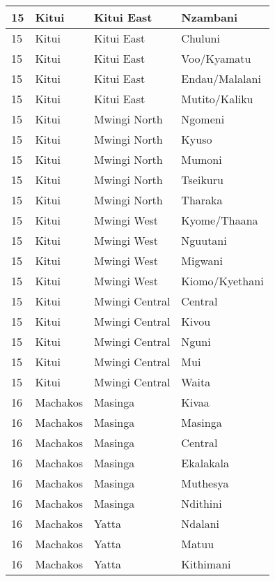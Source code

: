 \begin{table}[!ht]
\begin{tabular}{|l|l|l|l|}
        15 & Kitui & Kitui East & Nzambani \\ \hline
        15 & Kitui & Kitui East & Chuluni \\ \hline
        15 & Kitui & Kitui East & Voo/Kyamatu \\ \hline
        15 & Kitui & Kitui East & Endau/Malalani \\ \hline
        15 & Kitui & Kitui East & Mutito/Kaliku \\ \hline
        15 & Kitui & Mwingi North & Ngomeni \\ \hline
        15 & Kitui & Mwingi North & Kyuso \\ \hline
        15 & Kitui & Mwingi North & Mumoni \\ \hline
        15 & Kitui & Mwingi North & Tseikuru \\ \hline
        15 & Kitui & Mwingi North & Tharaka \\ \hline
        15 & Kitui & Mwingi West & Kyome/Thaana \\ \hline
        15 & Kitui & Mwingi West & Nguutani \\ \hline
        15 & Kitui & Mwingi West & Migwani \\ \hline
        15 & Kitui & Mwingi West & Kiomo/Kyethani \\ \hline
        15 & Kitui & Mwingi Central & Central \\ \hline
        15 & Kitui & Mwingi Central & Kivou \\ \hline
        15 & Kitui & Mwingi Central & Nguni \\ \hline
        15 & Kitui & Mwingi Central & Mui \\ \hline
        15 & Kitui & Mwingi Central & Waita \\ \hline
        16 & Machakos & Masinga & Kivaa \\ \hline
        16 & Machakos & Masinga & Masinga \\ \hline
        16 & Machakos & Masinga & Central \\ \hline
        16 & Machakos & Masinga & Ekalakala \\ \hline
        16 & Machakos & Masinga & Muthesya \\ \hline
        16 & Machakos & Masinga & Ndithini \\ \hline
        16 & Machakos & Yatta & Ndalani \\ \hline
        16 & Machakos & Yatta & Matuu \\ \hline
        16 & Machakos & Yatta & Kithimani \\ \hline

\end{tabular}
\end{table}
